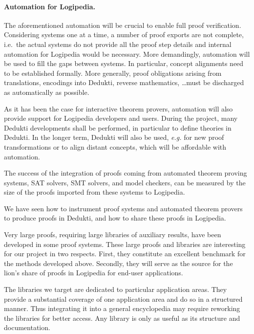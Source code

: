 \paragraph*{Automation for Logipedia.}
The aforementioned automation will be crucial to enable full proof
verification. Considering systems one at a time, a number of proof
exports are not complete, i.e.~the actual systems do not provide
all the proof step details and internal automation for Logipedia would be
necessary. More demandingly, automation will be used to fill the gaps
between systems. In particular, concept alignments need to be established
formally. More generally, proof obligations arising from translations,
encodings into Dedukti, reverse mathematics, \dots must be discharged
as automatically as possible.

As it has been the case for interactive theorem provers, automation
will also provide support for Logipedia developers and users. During
the project, many Dedukti developments shall be performed, in
particular to define theories in Dedukti. In the longer term, Dedukti
will also be used, {\em e.g.} for new proof transformations or to
align distant concepts, which will be affordable with automation.

The success of the integration of proofs coming from automated theorem
proving systems, SAT solvers, SMT solvers, and model checkers, can be
measured by the size of the proofs imported from these systems to Logipedia.


We have seen how to instrument proof systems and automated theorem
provers to produce proofs in Dedukti, and how to share these proofs in
Logipedia.

Very large proofs, requiring large libraries of auxiliary results,
have been developed in some proof systems. These large proofs and
libraries are interesting for our project in two respects. First, they
constitute an excellent benchmark for the methods developed
above. Secondly, they will serve as the source for the lion's share of
proofs in Logipedia for end-user applications.

The libraries we target are dedicated to particular application
areas. They provide a substantial coverage of one application area
and do so in a structured manner. Thus integrating it into a general encyclopedia
may require reworking the libraries for better access. Any library
is only as useful as its structure and documentation.

